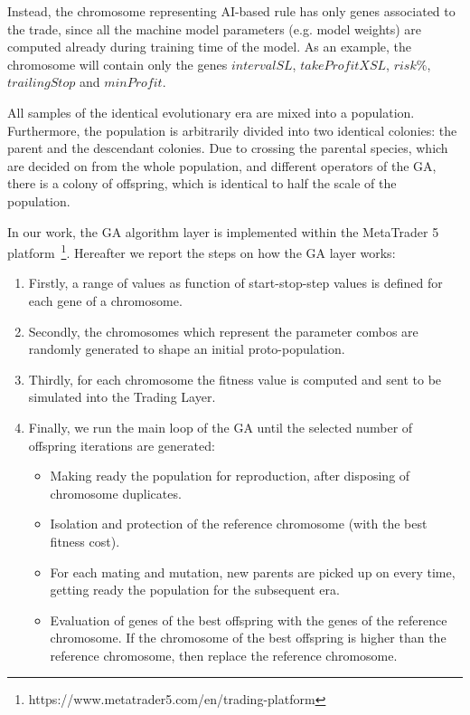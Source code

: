 Instead, the chromosome representing AI-based rule has only genes associated to the trade, since all the machine model parameters (e.g. model weights) are computed already during training time of the model. As an example, the chromosome will contain only the genes $intervalSL$, $takeProfitXSL$, $risk\%$, $trailingStop$ and $minProfit$.

All samples of the identical evolutionary era are mixed into a population. Furthermore, the population is arbitrarily divided into two identical colonies: the parent and the descendant colonies. Due to crossing the parental species, which are decided on from the whole population, and different operators of the GA, there is a colony of offspring, which is identical to half the scale of the population.

In our work, the GA algorithm layer is implemented within the MetaTrader 5 platform~\footnote{https://www.metatrader5.com/en/trading-platform}.
Hereafter we report the steps on how the GA layer works:

\begin{enumerate}
\setlength\itemsep{0.3em}
\item Firstly, a range of values as function of start-stop-step values is defined for each gene of a chromosome.
\item Secondly, the chromosomes which represent the parameter combos are randomly generated to shape an initial proto-population.
\item Thirdly, for each chromosome the fitness value is computed and sent to be simulated into the Trading Layer.
\item Finally, we run the main loop of the GA until the selected number of offspring iterations are generated:
\begin{itemize}	
	\item Making ready the population for reproduction, after disposing of chromosome duplicates.
	\item Isolation and protection of the reference chromosome (with the best fitness cost).
	\item For each mating and mutation, new parents are picked up on every time, getting ready the population for the subsequent era.
	\item Evaluation of genes of the best offspring with the genes of the reference chromosome. If the chromosome of the best offspring is higher than the reference chromosome, then replace the reference chromosome.
\end{itemize}
\end{enumerate}

